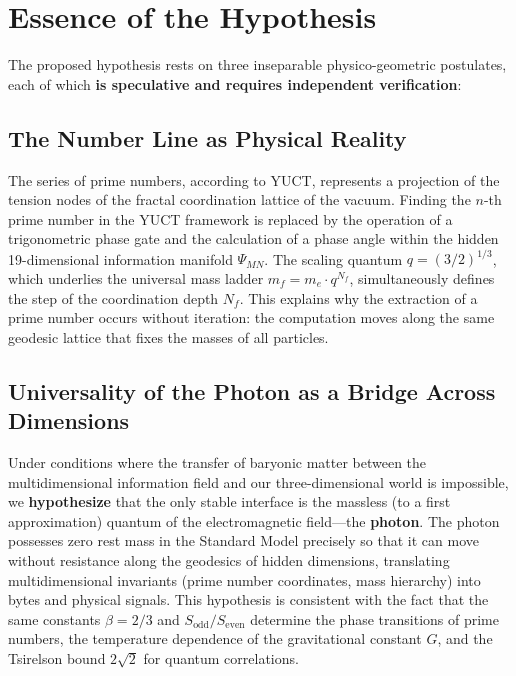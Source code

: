 \documentclass[11pt,a4paper]{article}
\begin{document}
	\section{Essence of the Hypothesis}
	The proposed hypothesis rests on three inseparable physico-geometric postulates, each of which \textbf{is speculative and requires independent verification}:
	
	\subsection{The Number Line as Physical Reality}
	The series of prime numbers, according to YUCT, represents a projection of the tension nodes of the fractal coordination lattice of the vacuum. Finding the $n$-th prime number in the YUCT framework is replaced by the operation of a trigonometric phase gate and the calculation of a phase angle within the hidden 19-dimensional information manifold $\Psi_{MN}$. The scaling quantum $q = (3/2)^{1/3}$, which underlies the universal mass ladder $m_f = m_e \cdot q^{N_f}$, simultaneously defines the step of the coordination depth $N_f$. This explains why the extraction of a prime number occurs without iteration: the computation moves along the same geodesic lattice that fixes the masses of all particles.
	
	\subsection{Universality of the Photon as a Bridge Across Dimensions}
	Under conditions where the transfer of baryonic matter between the multidimensional information field and our three-dimensional world is impossible, we \textbf{hypothesize} that the only stable interface is the massless (to a first approximation) quantum of the electromagnetic field—the \textbf{photon}. The photon possesses zero rest mass in the Standard Model precisely so that it can move without resistance along the geodesics of hidden dimensions, translating multidimensional invariants (prime number coordinates, mass hierarchy) into bytes and physical signals. This hypothesis is consistent with the fact that the same constants $\beta=2/3$ and $S_{\mathrm{odd}}/S_{\mathrm{even}}$ determine the phase transitions of prime numbers, the temperature dependence of the gravitational constant $G$, and the Tsirelson bound $2\sqrt{2}$ for quantum correlations.
	
\end{document}
